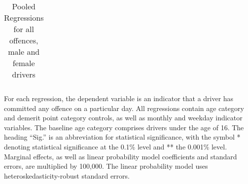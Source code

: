 \begin{table}
\begin{tabular}{l r r r r l r r l}
\hline 

\end{tabular} 
\caption{Pooled Regressions for all offences, male and female drivers} 
For each regression, the dependent variable is an indicator that a driver has committed  
any offence on a particular day.  
All regressions contain age category and demerit point category controls, 
as well as monthly and weekday indicator variables. 
The baseline age category comprises drivers under the age of 16. 
The heading ``Sig.'' is an abbreviation for statistical significance, with 
the symbol * denoting statistical significance at the 0.1\% level 
and ** the 0.001\% level. 
Marginal effects, as well as linear probability model coefficients and standard errors, are  
multiplied by 100,000.  
The linear probability model uses heteroskedasticity-robust standard errors. 
\label{tab:seas_Logit_vs_LPMx100K_pooled_regs} 
\end{table} 
 
